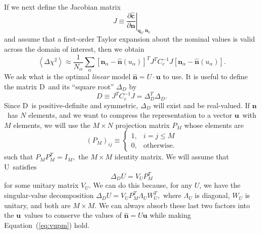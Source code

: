 \documentclass[linenumbers, onecolumn]{aastex63}
\newcommand{\eqq}[1]{Equation~(\ref{#1})}
\newcommand{\vecq}{\ensuremath{\mathbf{q}}}
\newcommand{\vecn}{\ensuremath{\mathbf{n}}}
\newcommand{\vecu}{\ensuremath{\mathbf{u}}}
\newcommand{\hatc}{\ensuremath{\hat{\mathbf{c}}}}
\newcommand{\covm}{C}
\newcommand{\matD}{D}
\newcommand{\matU}{U}
\newcommand{\matV}{V}
\newcommand{\proj}{P}  %
\newcommand{\jac}{J}   %
\newcommand{\ident}{I}  %
\newcommand{\DD}{\Delta_D}
\begin{document}
If we next define the Jacobian matrix
\begin{equation}
  \jac \equiv \left.\frac{\partial\hatc}{\partial\vecn}\right|_{\vecq_0, \vecn_0}
\label{eq:jacobian}
\end{equation}
and assume that a first-order Taylor expansion about the nominal values is valid across the domain of interest, then we obtain
\begin{equation}
  \left\langle \Delta\chi^2 \right\rangle \approx \frac{1}{N_\alpha} \sum_\alpha
  \left[ \vecn_\alpha - \hat{\vecn}(u_\alpha)\right]^T \jac^T \covm_c^{-1} \jac
  \left[ \vecn_\alpha - \hat{\vecn}(u_\alpha)\right].
  \label{eq:linearized}
\end{equation}
We ask what is the optimal \emph{linear} model $\hat{\vecn} = \matU \cdot \vecu$ to use.
It is useful to define the matrix \matD\ and its ``square root'' $\DD$ by
\begin{equation}
   \matD \equiv \jac^T \covm_c^{-1} \jac =  \DD^T \DD.
 \end{equation}
Since \matD\ is positive-definite and symmetric, $\DD$ will exist and be real-valued.
If \vecn\ has $N$ elements, and we want to compress the representation
to a vector \vecu\ with $M$ elements, we will use the $M\times N$ projection
matrix $\proj_M$ whose elements are
\begin{equation}
  \left(\proj_M\right)_{ij} \equiv
\begin{cases}
                                            1,  &  i=j\le M \\
                                            0,  & \text{otherwise.}
\end{cases}
\end{equation}
such that $\proj_M \proj_M^T=\ident_M,$ the $M\times M$ identity
matrix. We will assume that \matU\ satisfies
\begin{equation}
  \DD \matU = \matV_U \proj_M^T
\label{eq:vupm}
\end{equation}
for some unitary matrix $\matV_U$.  We can do this because, for any $\matU$, we have the
singular-value decomposition $\DD \matU = \matV_U P_M^T \Lambda_U
W_U^T,$ where $\Lambda_U$ is diagonal, $W_U$ is unitary, and both are
$M\times M$.  We can always absorb these last two factors into the \vecu\ values
to conserve the values of $\hat{\vecn} = \matU \vecu$ while making
\eqq{eq:vupm} hold.
\end{document}
